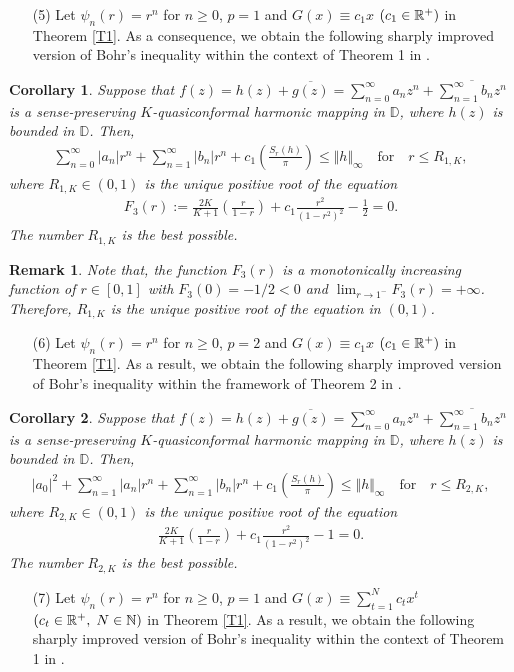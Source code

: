 \documentclass[11pt,reqno]{amsart}
\newtheorem{cor}{Corollary}[section]
\newtheorem{rem}{Remark}[section]
\newtheorem{open problem}{Open problem}[section]
\newcommand{\N}{{\Bbb{N}}}
\newcommand{\R}{{\Bbb{R}}}
\newcommand{\ol}{\overline}
\newcommand{\beas}{\begin{eqnarray*}}
\newcommand{\eeas}{\end{eqnarray*}}
\numberwithin{equation}{section}
\begin{document}
\begin{itemize}
\item[(5)] Let $\psi_n(r)=r^n$ for $n\geq 0$, $p=1$ and $G(x)\equiv c_1 x$ $(c_1\in\R^+)$ in \textrm{Theorem \ref{T1}}. 
As a consequence, we obtain the following sharply improved version of Bohr's inequality within the context of \textrm{Theorem 1} in \cite{KPS2018}.
\end{itemize}
\begin{cor} Suppose that $f(z)=h(z)+\ol{g(z)}=\sum_{n=0}^\infty a_n z^n+\ol{\sum_{n=1}^\infty b_n z^n}$ is a sense-preserving $K$-quasiconformal harmonic mapping in $\mathbb{D}$, where $h(z)$ is bounded in $\mathbb{D}$. Then,
\beas \sum_{n=0}^\infty |a_n|r^n+\sum_{n=1}^\infty |b_n| r^n+c_1\left(\frac{S_r(h)}{\pi}\right)\leq \Vert h\Vert_\infty\quad\text{for}\quad r\leq R_{1,K},\eeas
where $R_{1,K}\in(0,1)$ is the unique positive root of the equation 
\beas F_3(r):=\frac{2K}{K+1}\left(\frac{r}{1-r}\right)+c_1\frac{r^2}{\left(1-r^2\right)^2}-\frac{1}{2}=0.\eeas
The number $R_{1,K}$ is the best possible.
\end{cor}
\begin{rem}Note that, the function $F_3(r)$ is a monotonically increasing function of $r\in[0,1]$ with $F_3(0)=-1/2<0$ and $\lim_{r\to1^-}F_3(r)=+\infty$. Therefore, $R_{1,K}$ is the unique positive root of the equation in $(0,1)$.\end{rem}
\begin{itemize}
\item[(6)] Let $\psi_n(r)=r^n$ for $n\geq 0$, $p=2$ and $G(x)\equiv c_1 x$ $(c_1\in\R^+)$ in \textrm{Theorem \ref{T1}}. 
As a result, we obtain the following sharply improved version of Bohr's inequality within the framework of \textrm{Theorem 2} in \cite{KPS2018}.
\end{itemize}
\begin{cor} Suppose that $f(z)=h(z)+\ol{g(z)}=\sum_{n=0}^\infty a_n z^n+\ol{\sum_{n=1}^\infty b_n z^n}$ is a sense-preserving $K$-quasiconformal harmonic mapping in $\mathbb{D}$, where $h(z)$ is bounded in $\mathbb{D}$. Then,
\beas |a_0|^2+\sum_{n=1}^\infty |a_n|r^n+\sum_{n=1}^\infty |b_n| r^n+c_1\left(\frac{S_r(h)}{\pi}\right)\leq \Vert h\Vert_\infty\quad\text{for}\quad r\leq R_{2,K},\eeas
where $R_{2,K}\in(0,1)$ is the unique positive root of the equation 
\beas \frac{2K}{K+1}\left(\frac{r}{1-r}\right)+c_1\frac{r^2}{\left(1-r^2\right)^2}-1=0.\eeas
The number $R_{2,K}$ is the best possible.
\end{cor}
\begin{itemize}
\item[(7)] Let $\psi_n(r)=r^n$ for $n\geq 0$, $p=1$ and $G(x)\equiv \sum_{t=1}^N c_t x^t$ $(c_t\in\R^+,\; N\in\N)$ in \textrm{Theorem \ref{T1}}. 
As a result, we obtain the following sharply improved version of Bohr's inequality within the context of \textrm{Theorem 1} in \cite{KPS2018}.
\end{itemize}
\end{document}
